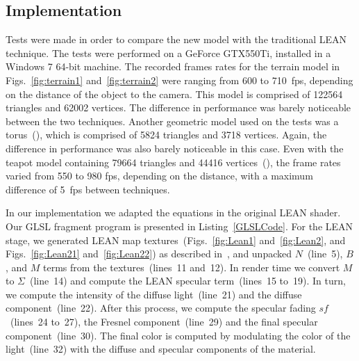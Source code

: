 \documentclass[10pt, conference]{IEEEtran}
\begin{document}


\subsection{Implementation}
\label{sec:implementation}

Tests were made in order to compare the new model with the traditional LEAN technique. The tests were performed on a GeForce GTX550Ti, installed in a Windows 7 64-bit machine. The recorded frames rates for the terrain model in Figs.~\ref{fig:terrain1} and~\ref{fig:terrain2} were ranging from 600 to 710~fps, depending on the distance of the object to the camera. This model is comprised of 122564 triangles and 62002 vertices. The difference in performance was barely noticeable between the two techniques. Another geometric model used on the tests was a torus~(), which is comprised of 5824 triangles and 3718 vertices. Again, the difference in performance was also barely noticeable in this case. Even with the teapot model containing 79664 triangles and 44416 vertices~(), the frame rates varied from 550 to 980 fps, depending on the distance, with a maximum difference of 5~fps between techniques.

In our implementation we adapted the equations in the original LEAN shader. Our GLSL fragment program is presented in Listing~\ref{GLSLCode}. For the LEAN stage, we generated LEAN map textures~(Figs.~\ref{fig:Lean1} and~\ref{fig:Lean2}, and Figs.~\ref{fig:Lean21} and~\ref{fig:Lean22}) as described in~\cite{Olano:2010:LM:1730804.1730834}, and unpacked $N$~(line~5), $B$, and $M$ terms from the textures~(lines~11 and~12). In render time we convert $M$ to $\Sigma$~(line~14) and compute the LEAN specular term~(lines~15 to~19). In turn, we compute the intensity of the diffuse light~(line~21) and the diffuse component~(line~22). After this process, we compute the specular fading $sf$~(lines~24 to~27), the Fresnel component~(line~29) and the final specular component~(line~30). The final color is computed by modulating the color of the light~(line~32) with the diffuse and specular components of the material.
\end{document}
